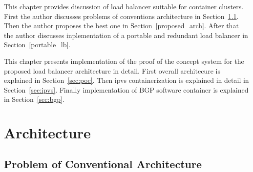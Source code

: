 This chapter provides discussion of load balancer suitable for container clusters.
First the author discusses problems of conventions architecture in Section~\ref{problem_k8s}.
Then the author proposes the best one in Section~\ref{proposed_arch}.
After that the author discusses inplementation of  a portable and redundant load balancer in Section~\ref{portable_lb}. 

This chapter presents implementation of the proof of the concept system for the proposed load balancer architecture in detail.
First overall architecure is explained in Section~\ref{sec:poc}.
Then ipvs containerization is explained in detail in Section~\ref{sec:ipvs}.
Finally implementation of BGP software container is explained in Section~\ref{sec:bgp}.

\section{Architecture}

\subsection{Problem of Conventional Architecture}\label{problem_k8s}

